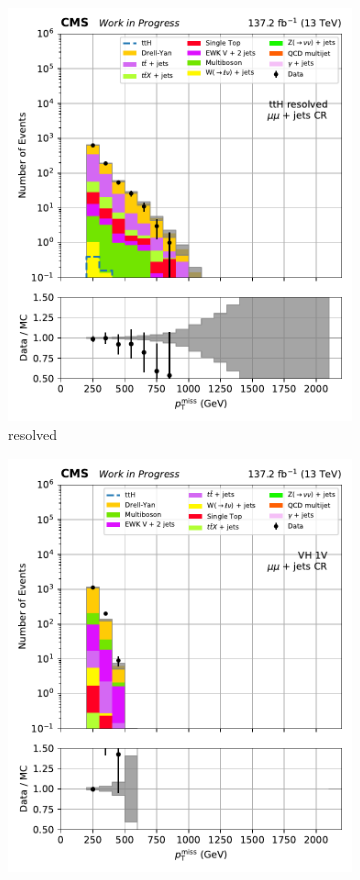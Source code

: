 \begin{figure}[htbp]
\begin{subfigure}[b]{0.24\textwidth}
        \includegraphics[width=\textwidth]{figures/region_plots/2016to18/region_2/ttH_resolved.pdf}
        \caption{\ttH resolved}
    \end{subfigure}
    \begin{subfigure}[b]{0.24\textwidth}
        \includegraphics[width=\textwidth]{figures/region_plots/2016to18/region_2/VH_1V.pdf}

\end{subfigure}
\end{figure}
